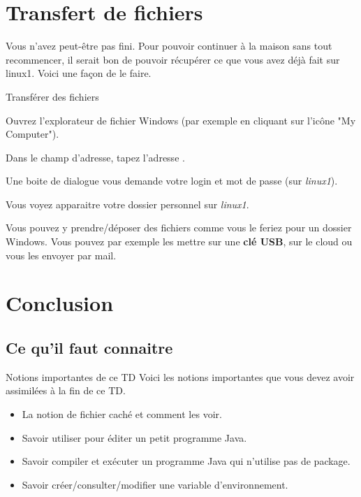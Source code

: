 \documentclass[a4paper,11pt]{style-esi/td}
\begin{document}
\section{Transfert de fichiers}  

	Vous n'avez peut-être pas fini. Pour pouvoir continuer à la maison sans tout recommencer, 
    il serait bon de pouvoir récupérer ce que vous avez déjà fait sur linux1.
	Voici une façon de le faire.			
				
	\begin{Tutoriel}{Transférer des fichiers}
	\begin{steps}		
		\item 
			Ouvrez l'explorateur de fichier Windows (par exemple en cliquant sur l'icône "My Computer").
		\item 
			Dans le champ d'adresse, tapez l'adresse .
		\item 
			Une boite de dialogue vous demande votre login et mot de passe (sur \textit{linux1}).
		\item 
			Vous voyez apparaitre votre dossier personnel sur \textit{linux1}. 
		\item 
			Vous pouvez y prendre/déposer des fichiers comme vous le feriez pour un dossier Windows. 
			Vous pouvez par exemple les mettre sur une \textbf{clé USB},
			sur le cloud ou vous les envoyer par mail.
	\end{steps}
	\end{Tutoriel}			

\section{Conclusion}

	\subsection{Ce qu'il faut connaitre}

		\begin{theorie}{Notions importantes de ce TD}
			Voici les notions importantes que vous devez avoir assimilées à la fin de ce TD.
			\begin{itemize}
			\item 
				La notion de fichier caché et comment les voir.
			\item 
				Savoir utiliser  pour éditer un petit programme Java.
			\item 
				Savoir compiler et exécuter un programme Java 
				qui n'utilise pas de package.
			\item 
				Savoir créer/consulter/modifier une variable d'environnement.
			\end{itemize}
		\end{theorie}
\end{document}
